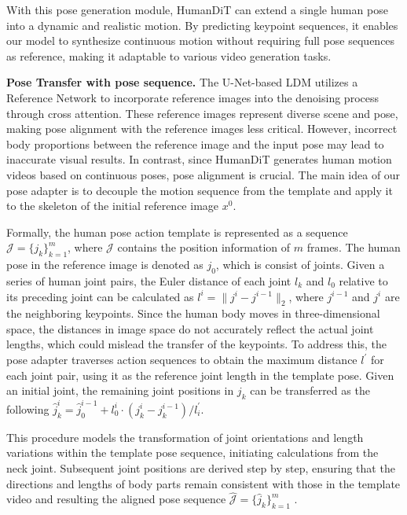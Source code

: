 With this pose generation module, HumanDiT can extend a single human pose into a dynamic and realistic motion. By predicting keypoint sequences, it enables our model to synthesize continuous motion without requiring full pose sequences as reference, making it adaptable to various video generation tasks.

\noindent\textbf{Pose Transfer with pose sequence.}
The U-Net-based LDM utilizes a Reference Network to incorporate reference images into the denoising process through cross attention. These reference images represent diverse scene and pose, making pose alignment with the reference images less critical. However, incorrect body proportions between the reference image and the input pose may lead to inaccurate visual results. In contrast, since HumanDiT generates human motion videos based on continuous poses, pose alignment is crucial. The main idea of our pose adapter is to decouple the motion sequence from the template and apply it to the skeleton of the initial reference image $ x^0 $.

Formally, the human pose action template is represented as a sequence $\mathcal{J} = \{j_k\}^m_{k=1} $, where $\mathcal{J}$ contains the position information of $m$ frames. The human pose in the reference image is denoted as $ j_0 $, which is consist of joints. Given a series of human joint pairs, the Euler distance of each joint $l_k$ and $l_0$ relative to its preceding joint can be calculated as $l^i = \| j^i - j^{i-1} \|_2$, where $j^{i-1}$ and $j^i$ are the neighboring keypoints. Since the human body moves in three-dimensional space, the distances in image space do not accurately reflect the actual joint lengths, which could mislead the transfer of the keypoints. To address this, the pose adapter traverses action sequences to obtain the maximum distance $l^{\prime}$ for each joint pair, using it as the reference joint length in the template pose. Given an initial joint, the remaining joint positions in $j_k$ can be transferred as the following
$
\hat{j}^i_k = \hat{j}^{i-1}_0 + l^i_0 \cdot (j^i_k - j^{i-1}_k)/l_i^{\prime}.
$

This procedure models the transformation of joint orientations and length variations within the template pose sequence, initiating calculations from the neck joint. Subsequent joint positions are derived step by step, ensuring that the directions and lengths of body parts remain consistent with those in the template video and resulting the aligned pose sequence $\hat{\mathcal{J}} = \{\hat{j}_k\}^m_{k=1}$ . 

